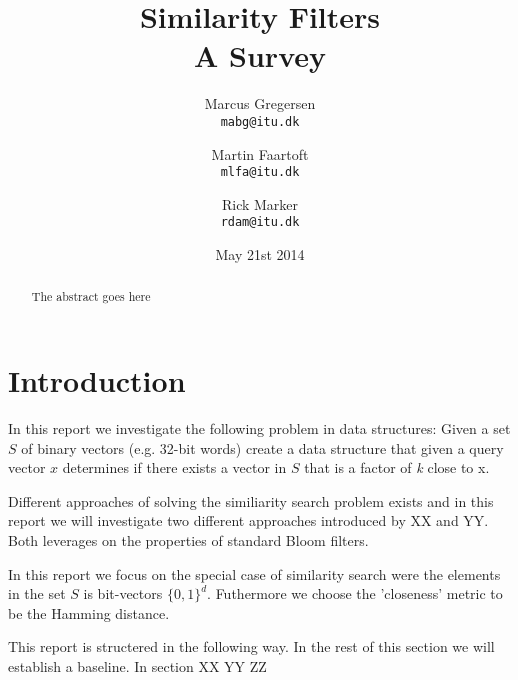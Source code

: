\documentclass[a4paper,11pt]{article}
\begin{document}
\date{May 21st 2014}
\title{Similarity Filters\\A Survey}

\author{Marcus Gregersen\\
\texttt{mabg@itu.dk}
\and Martin Faartoft\\
\texttt{mlfa@itu.dk}
\and Rick Marker\\
\texttt{rdam@itu.dk}}
\clearpage\maketitle
\thispagestyle{empty}
\setcounter{page}{1}
\begin{abstract}
The abstract goes here
\end{abstract}

\newpage

\section{Introduction}
In this report we investigate the following problem in data structures:
Given a set $S$ of binary vectors (e.g. 32-bit words) create a data structure that given a query vector $x$ determines if there exists a vector in $S$ that is a factor of \textit{k} close to x.

Different approaches of solving the similiarity search problem exists and in this report we will investigate two different approaches introduced by XX and YY. 
Both leverages on the properties of standard Bloom filters.

In this report we focus on the special case of similarity search were the elements in the set $S$ is bit-vectors $\{0,1\}^d$. Futhermore we choose the 'closeness' metric to be the Hamming distance.

This report is structered in the following way. In the rest of this section we will establish a baseline. In section XX YY ZZ
\end{document}
